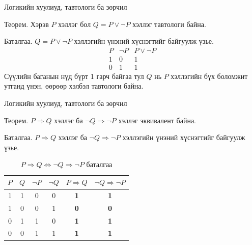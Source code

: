 \begin{frame}[allowframebreaks]{Логикийн хуулиуд, тавтологи ба зөрчил}
\begin{example}
   Теорем.  Хэрэв $P$ хэллэг бол $Q=P\lor\lnot P$ хэллэг тавтологи байна.

   Баталгаа.  $Q=P\lor\lnot P$ хэллэгийн үнэний хүснэгтийг байгуулж үзье. 
   \[
\begin{array}{c|c|c}
P & \lnot P & P\lor\lnot P\\\hline
1 & 0 & 1\\
0 & 1 & 1
\end{array}
\]
Сүүлийн баганын нүд бүрт 1 гарч байгаа тул $Q$ нь $P$ хэллэгийн бүх боломжит утганд үнэн, өөрөөр хэлбэл тавтологи байна.
\end{example}
\end{frame}

\begin{frame}[allowframebreaks]{Логикийн хуулиуд, тавтологи ба зөрчил}
\begin{example}\label{Урвуу хэллэг}
 Теорем. $P\Rightarrow Q$ хэллэг ба $\lnot Q\Rightarrow \lnot P$ хэллэг эквивалент байна.

   Баталгаа.  $P\Rightarrow Q$ хэллэг ба $\lnot Q\Rightarrow \lnot P$ хэллэгийн үнэний хүснэгтийг байгуулж үзье. 
\begin{table}[h]
\centering
\begin{fitbox}\begin{tabular}{c|c|c|c|c|c}
$P$ & $Q$ & $\neg P$ & $\neg Q$ & $P \Rightarrow Q$ & $\neg Q \Rightarrow \neg P$ \\ \hline
1   & 1   & 0        & 0        & \textbf{1}        & \textbf{1}        \\ 
1   & 0   & 0        & 1        & \textbf{0}        & \textbf{0}        \\ 
0   & 1   & 1        & 0        & \textbf{1}        & \textbf{1}        \\
0   & 0   & 1        & 1        & \textbf{1}        & \textbf{1}        \\ 
\end{tabular}\end{fitbox}
\caption*{$P \Rightarrow Q \Leftrightarrow \neg Q \Rightarrow \neg P$ баталгаа}
\end{table}
\end{example}
\end{frame}

